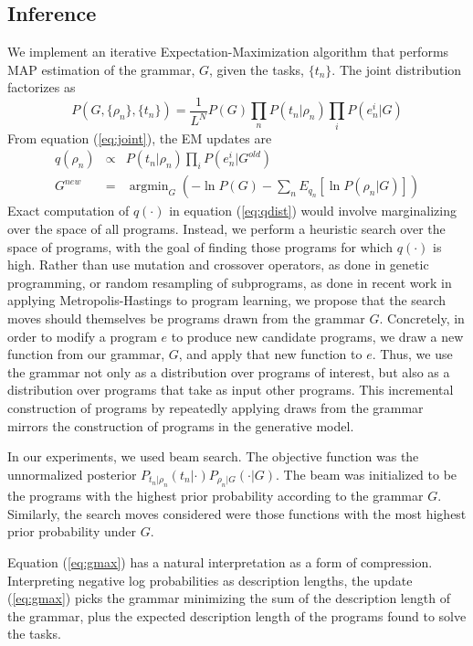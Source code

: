 \documentclass{article} %
\begin{document}
\subsection{Inference}
We implement an iterative Expectation-Maximization algorithm that performs MAP estimation of the grammar, $G$, given the tasks, $\{t_n\}$.
The joint distribution factorizes as
\begin{equation}
P(G,\{\rho_n\},\{t_n\}) = \frac{1}{L^N} P(G) \prod_n P(t_n | \rho_n) \prod_i P(e^i_n | G)
\label{eq:joint}
\end{equation}
From equation (\ref{eq:joint}), the EM updates are
\begin{eqnarray}
q(\rho_n) &\propto& P(t_n | \rho_n) \prod_i P(e^i_n | G^{old})\\
\label{eq:qdist}
G^{new} &=& \operatorname{argmin}_G \left( -\ln P(G) -
\sum_n 
E_{q_n}
 \left[ \ln P(\rho_n | G) \right] \right)
 \label{eq:gmax}
\end{eqnarray}
Exact computation of $q(\cdot)$ in equation (\ref{eq:qdist}) would involve marginalizing over the space of all programs.
Instead, we perform a heuristic search over the space of programs, with the goal of finding those programs for which $q(\cdot)$ is high.
Rather than use mutation and crossover operators, as done in genetic programming, or random resampling of subprograms, as done in recent work in applying Metropolis-Hastings to program learning, we propose that the search moves should themselves be programs drawn from the grammar $G$.
Concretely, in order to modify a program $e$ to produce new candidate programs, we draw a new function from our grammar, $G$, and apply that new function to $e$.
Thus, we use the grammar not only as a distribution over programs of interest, but also as a distribution over programs that take as input other programs.
This incremental construction of programs by repeatedly applying draws from the grammar mirrors the construction of programs in the generative model.

In our experiments, we used beam search. The objective function was the unnormalized posterior $P_{t_n|\rho_n}(t_n | \cdot )P_{\rho_n | G}(\cdot | G)$.
The beam was initialized to be the programs with the highest prior probability according to the grammar $G$.
Similarly, the search moves considered were those functions with the most highest prior probability under $G$.

Equation (\ref{eq:gmax}) has a natural interpretation as a form of compression.
Interpreting negative log probabilities as description lengths, the update (\ref{eq:gmax}) picks the grammar minimizing the sum of the description length of the grammar, plus the expected description length of the programs found to solve the tasks.
\end{document}
